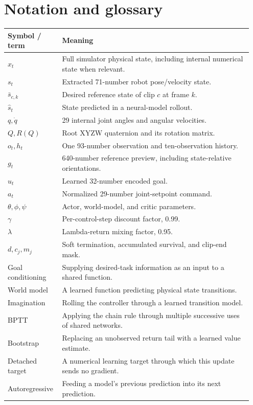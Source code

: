 \documentclass[11pt,a4paper]{article}
\begin{document}
\section{Notation and glossary}\label{app:notation}
\begin{longtable}{@{}p{0.20\linewidth}p{0.75\linewidth}@{}}
\toprule Symbol / term & Meaning\\\midrule\endhead
$x_t$ & Full simulator physical state, including internal numerical state when relevant.\\
$s_t$ & Extracted 71-number robot pose/velocity state.\\
$\bar s_{c,k}$ & Desired reference state of clip $c$ at frame $k$.\\
$\hat s_t$ & State predicted in a neural-model rollout.\\
$q,\dot q$ & 29 internal joint angles and angular velocities.\\
$Q,R(Q)$ & Root XYZW quaternion and its rotation matrix.\\
$o_t,h_t$ & One 93-number observation and ten-observation history.\\
$g_t$ & 640-number reference preview, including state-relative orientations.\\
$u_t$ & Learned 32-number encoded goal.\\
$a_t$ & Normalized 29-number joint-setpoint command.\\
$\theta,\phi,\psi$ & Actor, world-model, and critic parameters.\\
$\gamma$ & Per-control-step discount factor, 0.99.\\
$\lambda$ & Lambda-return mixing factor, 0.95.\\
$d,c_j,m_j$ & Soft termination, accumulated survival, and clip-end mask.\\
Goal conditioning & Supplying desired-task information as an input to a shared function.\\
World model & A learned function predicting physical state transitions.\\
Imagination & Rolling the controller through a learned transition model.\\
BPTT & Applying the chain rule through multiple successive uses of shared networks.\\
Bootstrap & Replacing an unobserved return tail with a learned value estimate.\\
Detached target & A numerical learning target through which this update sends no gradient.\\
Autoregressive & Feeding a model's previous prediction into its next prediction.\\

\end{longtable}
\end{document}

